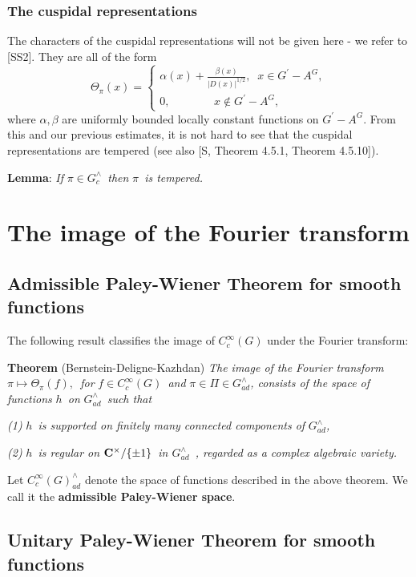 \subsubsection{The cuspidal representations}

The characters of the cuspidal representations will not be given here - we
refer to [SS2]. They are all of the form
\[
\Theta _\pi (x)=\left\{ 
\begin{array}{c}
\alpha (x)+ \frac{\beta (x)}{|D(x)|^{1/2}},\;\;x\in G^{\prime }-A^G, \\ 
0,\;\;\;\;\;\;\;\;\;\;\;\;\;\;x\notin G^{\prime }-A^G,
\end{array}
\right. 
\]
where $\alpha ,\beta $ are uniformly bounded locally constant functions on $%
G^{\prime }-A^G.$ From this and our previous estimates, it is not hard to
see that the cuspidal representations are tempered (see also [S, Theorem
4.5.1, Theorem 4.5.10]).

{\bf Lemma}: {\em If }$\pi \in G_c^{\wedge }${\em \ then }$\pi ${\em \ is
tempered.}

\section{The image of the Fourier transform}

\subsection{Admissible Paley-Wiener Theorem for smooth functions}

The following result classifies the image of $C_c^\infty (G)$ under the
Fourier transform:

{\bf Theorem} (Bernstein-Deligne-Kazhdan) {\em The image of the Fourier
transform }$\pi \longmapsto \Theta _\pi (f),${\em \ for }$f\in C_c^\infty
(G) ${\em \ and }$\pi \in \Pi \in G_{ad}^{\wedge }${\em , consists of the
space of functions }$h${\em \ on }$G_{ad}^{\wedge }${\em \ such that}

{\em (1) }$h${\em \ is supported on finitely many connected components of }$%
G_{ad}^{\wedge }${\em ,}

{\em (2) }$h${\em \ is regular on }${\bf C}^{\times }/\{\pm 1\}${\em \ in $%
G_{ad}^{\wedge }$\ , regarded as a complex algebraic variety.}

Let $C_c^\infty (G)_{ad}^{\wedge }$ denote the space of functions described
in the above theorem. We call it the {\bf admissible Paley-Wiener space}.

\subsection{Unitary Paley-Wiener Theorem for smooth functions}

